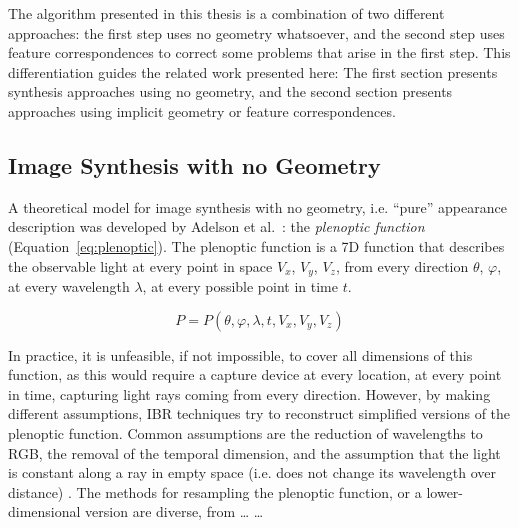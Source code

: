 The algorithm presented in this thesis is a combination of two different approaches: the first step uses no geometry whatsoever, and the second step uses feature correspondences to correct some problems that arise in the first step. This differentiation guides the related work presented here: The first section presents synthesis approaches using no geometry, and the second section presents approaches using implicit geometry or feature correspondences.


\subsection{Image Synthesis with no Geometry}
A theoretical model for image synthesis with no geometry, i.e. ``pure'' appearance description was developed by Adelson et al.\ \cite{Adelson91}: the \emph{plenoptic function} (Equation~\ref{eq:plenoptic}). The plenoptic function is a 7D function that describes the observable light at every point in space $V_x$, $V_y$, $V_z$, from every direction $\theta$, $\varphi$, at every wavelength $\lambda$, at every possible point in time $t$.

\begin{equation}
  \label{eq:plenoptic}
  P = P(\theta, \varphi, \lambda, t, V_x, V_y, V_z)
\end{equation}

In practice, it is unfeasible, if not impossible, to cover all dimensions of this function, as this would require a capture device at every location, at every point in time, capturing light rays coming from every direction. However, by making different assumptions, IBR techniques try to reconstruct simplified versions of the plenoptic function. Common assumptions are the reduction of wavelengths to RGB, the removal of the temporal dimension, and the assumption that the light is constant along a ray in empty space (i.e. does not change its wavelength over distance) \cite{survey2004}. The methods for resampling the plenoptic function, or a lower-dimensional version are diverse, from \ldots \cite{lightfield} \ldots 

